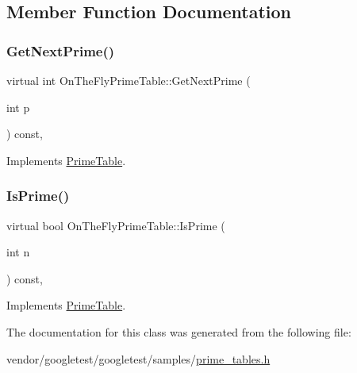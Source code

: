 \subsection{Member Function Documentation}
\mbox{\label{class_on_the_fly_prime_table_a5a4644fedd95d33136723f33b9302bfc}} 
\subsubsection{\texorpdfstring{Get\+Next\+Prime()}{GetNextPrime()}}
{\footnotesize\ttfamily virtual int On\+The\+Fly\+Prime\+Table\+::\+Get\+Next\+Prime (\begin{DoxyParamCaption}\item[{int}]{p }\end{DoxyParamCaption}) const\hspace{0.3cm}{\ttfamily [inline]}, {\ttfamily [virtual]}}



Implements \hyperlink{class_prime_table_ae537c939f56617d8937d57bbbae3ab30}{Prime\+Table}.

\mbox{\label{class_on_the_fly_prime_table_a1d49b78f79e018441289e79d75680067}} 
\subsubsection{\texorpdfstring{Is\+Prime()}{IsPrime()}}
{\footnotesize\ttfamily virtual bool On\+The\+Fly\+Prime\+Table\+::\+Is\+Prime (\begin{DoxyParamCaption}\item[{int}]{n }\end{DoxyParamCaption}) const\hspace{0.3cm}{\ttfamily [inline]}, {\ttfamily [virtual]}}



Implements \hyperlink{class_prime_table_a2ab9243364ded0c51541f641b2df362a}{Prime\+Table}.



The documentation for this class was generated from the following file\+:\begin{DoxyCompactItemize}
\item 
vendor/googletest/googletest/samples/\hyperlink{prime__tables_8h}{prime\+\_\+tables.\+h}\end{DoxyCompactItemize}
